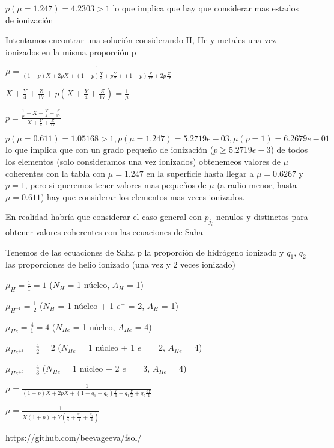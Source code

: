 \documentclass[10pt]{book}
\begin{document}
\begin{description}
$p(\mu = 1.247) = 4.2303 > 1$ lo que implica que hay que considerar mas estados de ionización

Intentamos encontrar una solución considerando H, He y metales una vez ionizados en la misma proporción p

$ \mu = \frac{1}{(1-p)X + 2p X+ (1-p)\frac{Y}{4} + p \frac{Y}{2}+ (1-p)\frac{Z}{17} + 2 p \frac{Z}{17}}$

$ X + \frac{Y}{4} +\frac{Z}{17}+  p (X + \frac{Y}{4} + \frac{Z}{17}) = \frac{1}{\mu} $

$ p = \frac{\frac{1}{\mu} - X - \frac{Y}{4} - \frac{Z}{17}}{X + \frac{Y}{4} + \frac{Z}{17}} $

$p(\mu = 0.611) = 1.05168 > 1, p(\mu = 1.247) = 5.2719e-03, \mu(p = 1) = 6.2679e-01 $ lo que 
implica que con un grado pequeño de ionización ($p \ge 5.2719e-3$) de todos los elementos (solo consideramos una vez ionizados) 
obtenemeos valores de $\mu$ coherentes con la tabla con  $\mu = 1.247$  en la superficie  hasta llegar  a $\mu = 0.6267$ y $p=1$, 
pero si queremos tener valores mas pequeños de $\mu$ (a radio menor, hasta $\mu = 0.611$)
hay que considerar los elementos mas veces ionizados.

En realidad habría que considerar el caso general con $p_{j_i}$ nenulos y distinctos para obtener valores coherentes con las ecuaciones de Saha 
 


\item Tenemos de las ecuaciones  de Saha p la proporción de hidrógeno ionizado y  $q_1$, $q_2$ las proporciones de helio ionizado (una vez y 2 veces ionizado)

$ \mu_H  = \frac{1}{1} = 1$ ($N_H$ = 1 núcleo, $A_H$ = 1)

$ \mu_{H^{+1}}  = \frac{1}{2} $ ($N_H$ = 1 núcleo + 1 $e^-$ = 2, $A_H$ = 1)

$ \mu_{He}  = \frac{4}{1} = 4$ ($N_{He}$ = 1 núcleo, $A_{He}$ = 4)

$ \mu_{He^{+1}}  = \frac{4}{2} = 2$ ($N_{He}$ = 1 núcleo + 1 $e^-$ = 2, $A_{He}$ = 4)

$ \mu_{He^{+2}}  = \frac{4}{3} $ ($N_{He}$ = 1 núcleo + 2 $e^-$ = 3, $A_{He}$ = 4)
 
$ \mu = \frac{1}{(1-p)X + 2pX + (1-q_1-q_2)  \frac{Y}{4} + q_1 \frac{Y}{2} + q_2 \frac{3Y}{4}}$

$ \mu = \frac{1}{X(1 + p) + Y (\frac{1}{4}  + \frac{q_1}{4} + \frac{q_2}{2})}$

\end{description}


 
https://github.com/beevageeva/fsol/
\end{document}
